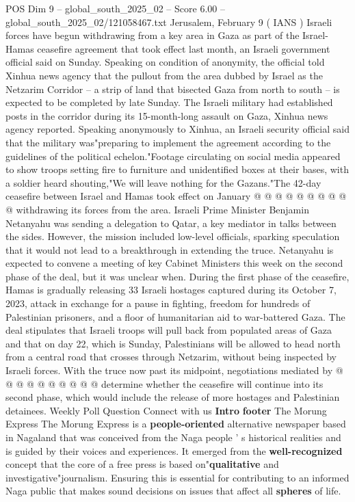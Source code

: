 \begin{textsample}{POS Dim 9 – global\_south\_2025\_02 – Score 6.00 – global\_south\_2025\_02/121058467.txt}  \label{ex:f9_pos_393}
Jerusalem, February 9 ( IANS ) Israeli forces have begun withdrawing from a key area in Gaza as part of the Israel-Hamas ceasefire agreement that took effect last month, an Israeli government official said on Sunday.
Speaking on condition of anonymity, the official told Xinhua news agency that the pullout from the area dubbed by Israel as the Netzarim Corridor -- a strip of land that bisected Gaza from north to south -- is expected to be completed by late Sunday.
The Israeli military had established posts in the corridor during its 15-month-long assault on Gaza, Xinhua news agency reported.
Speaking anonymously to Xinhua, an Israeli security official said that the military was"preparing to implement the agreement according to the guidelines of the political echelon."Footage circulating on social media appeared to show troops setting fire to furniture and unidentified boxes at their bases, with a soldier heard shouting,"We will leave nothing for the Gazans."The 42-day ceasefire between Israel and Hamas took effect on January @ @ @ @ @ @ @ @ @ @ withdrawing its forces from the area.
Israeli Prime Minister Benjamin Netanyahu was sending a delegation to Qatar, a key mediator in talks between the sides.
However, the mission included low-level officials, sparking speculation that it would not lead to a breakthrough in extending the truce.
Netanyahu is expected to convene a meeting of key Cabinet Ministers this week on the second phase of the deal, but it was unclear when.
During the first phase of the ceasefire, Hamas is gradually releasing 33 Israeli hostages captured during its October 7, 2023, attack in exchange for a pause in fighting, freedom for hundreds of Palestinian prisoners, and a floor of humanitarian aid to war-battered Gaza.
The deal stipulates that Israeli troops will pull back from populated areas of Gaza and that on day 22, which is Sunday, Palestinians will be allowed to head north from a central road that crosses through Netzarim, without being inspected by Israeli forces.
With the truce now past its midpoint, negotiations mediated by @ @ @ @ @ @ @ @ @ @ determine whether the ceasefire will continue into its second phase, which would include the release of more hostages and Palestinian detainees.
Weekly Poll Question Connect with us \textbf{Intro} \textbf{footer} The Morung Express The Morung Express is a \textbf{people-oriented} alternative newspaper based in Nagaland that was conceived from the Naga people ' s historical realities and is guided by their voices and experiences.
It emerged from the \textbf{well-recognized} concept that the core of a free press is based on"\textbf{qualitative} and investigative"journalism.
Ensuring this is essential for contributing to an informed Naga public that makes sound decisions on issues that affect all \textbf{spheres} of life.

\end{textsample}
